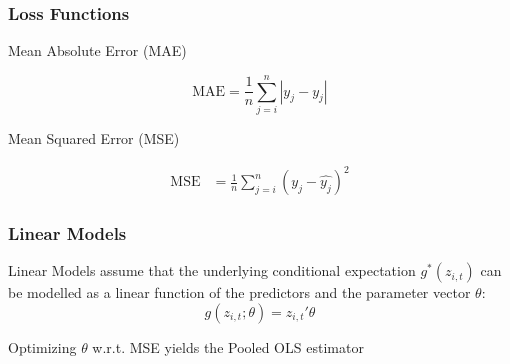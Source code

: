 \documentclass[]{beamer}
\begin{document}
\begin{frame}
\frametitle{Loss Functions}
Mean Absolute Error (MAE)

	\begin{equation}
	\text{MAE} = \frac{1}{n} \sum_{j = i}^{n} |y_j - \hat{y_j}|
	\end{equation}
	
Mean Squared Error (MSE)

	\begin{align}
	\text{MSE} &= \frac{1}{n} \sum_{j = i}^{n} \left( y_j - \hat{y_j}\right) ^2
	\end{align}
	

\end{frame}



\begin{frame}
\frametitle{Linear Models}
Linear Models assume that the underlying conditional expectation \( g^*(z_{i, t}) \) can be modelled as a linear function of the predictors and the parameter vector \( \theta \):
	\begin{equation}
	g(z_{i, t};\theta) = z_{i, t}' \theta
	\end{equation}
	
Optimizing $\theta$ w.r.t. MSE yields the Pooled OLS estimator
\end{frame}
\end{document}

